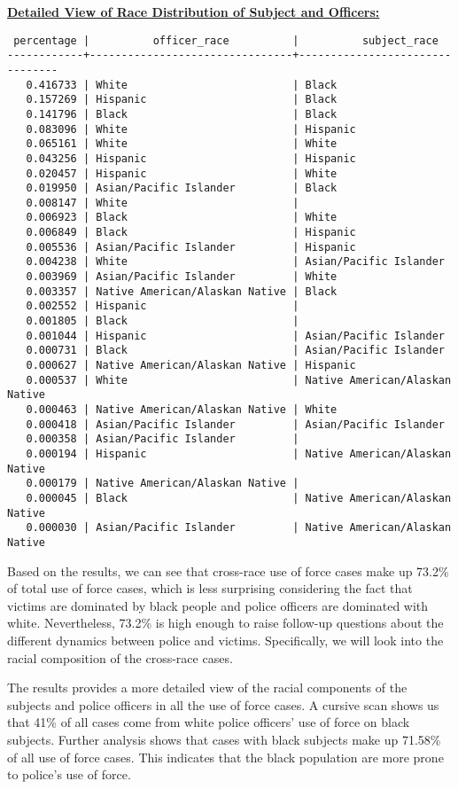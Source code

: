 \documentclass[10pt]{article}
\begin{document}
\underline{\textbf{Detailed View of Race Distribution of Subject and Officers:}}
\begin{verbatim}
 percentage |          officer_race          |          subject_race
------------+--------------------------------+--------------------------------
   0.416733 | White                          | Black
   0.157269 | Hispanic                       | Black
   0.141796 | Black                          | Black
   0.083096 | White                          | Hispanic
   0.065161 | White                          | White
   0.043256 | Hispanic                       | Hispanic
   0.020457 | Hispanic                       | White
   0.019950 | Asian/Pacific Islander         | Black
   0.008147 | White                          |
   0.006923 | Black                          | White
   0.006849 | Black                          | Hispanic
   0.005536 | Asian/Pacific Islander         | Hispanic
   0.004238 | White                          | Asian/Pacific Islander
   0.003969 | Asian/Pacific Islander         | White
   0.003357 | Native American/Alaskan Native | Black
   0.002552 | Hispanic                       |
   0.001805 | Black                          |
   0.001044 | Hispanic                       | Asian/Pacific Islander
   0.000731 | Black                          | Asian/Pacific Islander
   0.000627 | Native American/Alaskan Native | Hispanic
   0.000537 | White                          | Native American/Alaskan Native
   0.000463 | Native American/Alaskan Native | White
   0.000418 | Asian/Pacific Islander         | Asian/Pacific Islander
   0.000358 | Asian/Pacific Islander         |
   0.000194 | Hispanic                       | Native American/Alaskan Native
   0.000179 | Native American/Alaskan Native |
   0.000045 | Black                          | Native American/Alaskan Native
   0.000030 | Asian/Pacific Islander         | Native American/Alaskan Native
\end{verbatim}

Based on the results, we can see that cross-race use of force cases make up 73.2\% of total use of force cases, which is less surprising considering the fact that victims are dominated by black people and police officers are dominated with white. Nevertheless, 73.2\% is high enough to raise follow-up questions about the different dynamics between police and victims. Specifically, we will look into the racial composition of the cross-race cases.

The results provides a more detailed view of the racial components of the subjects and police officers in all the use of force cases. A cursive scan shows us that 41\% of all cases come from white police officers' use of force on black subjects. Further analysis shows that cases with black subjects make up 71.58\% of all use of force cases. This indicates that the black population are more prone to police's use of force.
\end{document}
